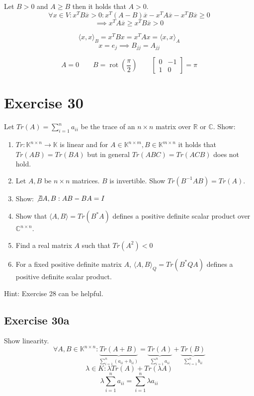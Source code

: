 \documentclass[a4paper]{article}
\theoremstyle{definition}
\begin{document}
Let $B > 0$ and $A \geq B$ then it holds that $A > 0$.
\[ \forall x \in V: x^T B \overline{x} > 0: x^T (A - B) \overline{x} - x^T A \overline{x}- x^T B \overline{x} \geq 0 \]
\[ \implies x^T A \overline{x} \geq x^T B \overline{x} > 0 \]


\[ \langle x, x\rangle_B = x^T B x = x^T Ax = \langle x,x\rangle_A \]
\[ x = e_j \implies B_{jj} = A_{jj} \]

\[ A = 0 \qquad B = \operatorname{rot}(\frac\pi2) \qquad \begin{bmatrix} 0 & -1 \\ 1 & 0 \end{bmatrix} = \pi \]

\section*{Exercise 30}
\begin{ex}
  Let $Tr(A) = \sum_{i=1}^n a_{ii}$ be the trace of an $n\times n$ matrix over $\mathbb R$ or $\mathbb C$.
  Show:
  \begin{enumerate}
    \item $Tr: \mathbb K^{n\times n} \to \mathbb K$ is linear and for $A \in \mathbb K^{n\times m}, B \in \mathbb K^{m\times n}$ it holds that $Tr(AB) = Tr(BA)$ but in general $Tr(ABC) = Tr(ACB)$ does not hold.
    \item Let $A,B$ be $n\times n$ matrices. $B$ is invertible. Show $Tr(B^{-1}AB) = Tr(A)$.
    \item Show: $\not\exists A,B: AB - BA = I$
    \item Show that $\langle A,B\rangle = Tr(B^*A)$ defines a positive definite scalar product over $\mathbb C^{n\times n}$.
    \item Find a real matrix $A$ such that $Tr(A^2) < 0$
    \item For a fixed positive definite matrix $A$, $\langle A,B\rangle_Q = Tr(B^*QA)$ defines a positive definite scalar product.
  \end{enumerate}
  Hint: Exercise 28 can be helpful.
\end{ex}

\subsection{Exercise 30a}

Show linearity.
\[ \forall A,B \in \mathbb K^{n \times n}: \underbrace{Tr(A + B)}_{\sum_{i=1}^n (a_{ii} + b_{ii})} = \underbrace{Tr(A)}_{\sum_{i=1}^n a_{ii}} + \underbrace{Tr(B)}_{\sum_{i=1}^n b_{ii}} \]
\[ \lambda \in K: \lambda Tr(A) + Tr(\lambda A) \]
\[ \lambda \sum_{i=1}^n a_{ii} = \sum_{i=1}^n \lambda a_{ii} \]
\end{document}
